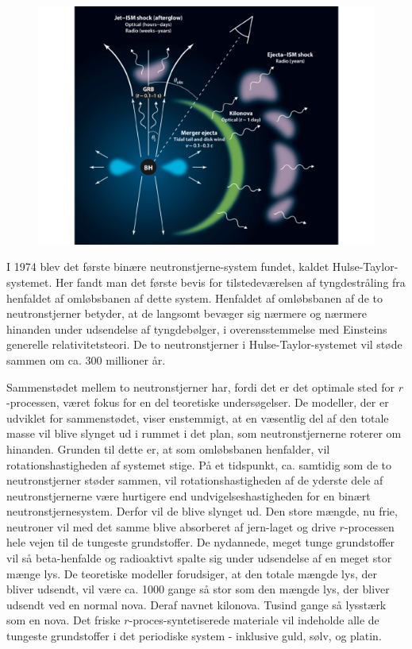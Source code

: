 \documentclass[twocolumn]{article}
\begin{document}
\begin{figure}
\includegraphics[width=\columnwidth]{KN_scematic_berger.pdf}
\end{figure}

I 1974 blev det første binære neutronstjerne-system fundet, kaldet Hulse-Taylor-systemet. Her fandt man det første bevis for tilstedeværelsen af tyngdestråling fra henfaldet af omløbsbanen af dette system. Henfaldet af omløbsbanen af de to neutronstjerner betyder, at de langsomt bevæger sig nærmere og nærmere hinanden under udsendelse af tyngdebølger,  i overensstemmelse med Einsteins generelle relativitetsteori. De to neutronstjerner i Hulse-Taylor-systemet vil støde sammen om ca. 300 millioner år.

Sammenstødet mellem to neutronstjerner har, fordi det er det optimale sted for $r$-processen, været fokus for en del teoretiske undersøgelser. De modeller, der er udviklet for sammenstødet, viser enstemmigt, at en væsentlig del af den totale masse vil blive slynget ud i rummet i det plan, som neutronstjernerne roterer om hinanden. Grunden til dette er, at som omløbsbanen henfalder, vil rotationshastigheden af systemet stige. På et tidspunkt, ca. samtidig som de to neutronstjerner støder sammen, vil rotationshastigheden af de yderste dele af neutronstjernerne være hurtigere end undvigelseshastigheden for en binært neutronstjernesystem. Derfor vil de blive slynget ud. Den store mængde, nu frie, neutroner vil med det samme blive absorberet af jern-laget og drive $r$-processen hele vejen til de tungeste grundstoffer. De nydannede, meget tunge grundstoffer vil så beta-henfalde og radioaktivt spalte sig under udsendelse af en meget stor mænge lys. De teoretiske modeller forudsiger, at den totale mængde lys, der bliver udsendt, vil være ca. 1000 gange så stor som den mængde lys, der bliver udsendt ved en normal nova. Deraf navnet kilonova. Tusind gange så lysstærk som en nova. Det friske $r$-proces-syntetiserede materiale vil indeholde alle de tungeste grundstoffer i det periodiske system - inklusive guld, sølv, og platin.
\end{document}
